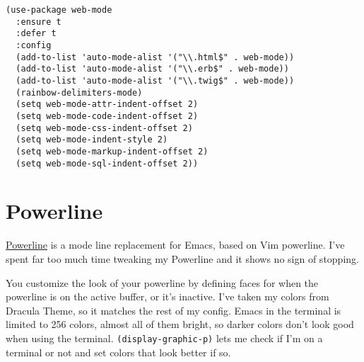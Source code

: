 \documentclass{article}
\begin{document}
\begin{verbatim}
(use-package web-mode
  :ensure t
  :defer t
  :config
  (add-to-list 'auto-mode-alist '("\\.html$" . web-mode))
  (add-to-list 'auto-mode-alist '("\\.erb$" . web-mode))
  (add-to-list 'auto-mode-alist '("\\.twig$" . web-mode))
  (rainbow-delimiters-mode)
  (setq web-mode-attr-indent-offset 2)
  (setq web-mode-code-indent-offset 2)
  (setq web-mode-css-indent-offset 2)
  (setq web-mode-indent-style 2)
  (setq web-mode-markup-indent-offset 2)
  (setq web-mode-sql-indent-offset 2))
\end{verbatim}

\section{Powerline}
\label{sec-11}

\href{https://github.com/milkypostman/powerline}{Powerline} is a mode line replacement for Emacs, based on Vim powerline. I've spent far too much time tweaking my Powerline and it shows no sign of stopping.

You customize the look of your powerline by defining faces for when the powerline is on the active buffer, or it's inactive. I've taken my colors from Dracula Theme, so it matches the rest of my config. Emacs in the terminal is limited to 256 colors, almost all of them bright, so darker colors don't look good when using the terminal. \texttt{(display-graphic-p)} lets me check if I'm on a terminal or not and set colors that look better if so.
\end{document}
